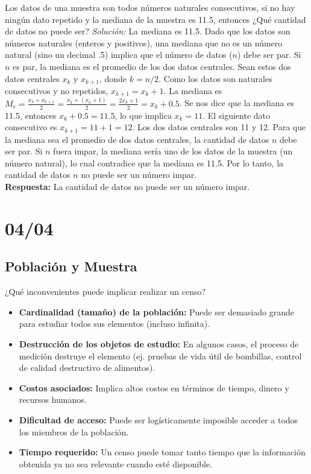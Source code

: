 \documentclass[12pt, letterpaper]{article}
\begin{document}
\vspace{1em}
\noindent Los datos de una muestra son todos números naturales consecutivos, si no hay ningún dato repetido y la mediana de la muestra es 11.5, entonces ¿Qué cantidad de datos no puede ser?
\textit{Solución:}
La mediana es 11.5. Dado que los datos son números naturales (enteros y positivos), una mediana que no es un número natural (sino un decimal .5) implica que el número de datos ($n$) debe ser par.
Si $n$ es par, la mediana es el promedio de los dos datos centrales. Sean estos dos datos centrales $x_k$ y $x_{k+1}$, donde $k=n/2$.
Como los datos son naturales consecutivos y no repetidos, $x_{k+1} = x_k + 1$.
La mediana es $M_e = \frac{x_k + x_{k+1}}{2} = \frac{x_k + (x_k+1)}{2} = \frac{2x_k+1}{2} = x_k + 0.5$.
Se nos dice que la mediana es 11.5, entonces $x_k + 0.5 = 11.5$, lo que implica $x_k = 11$.
El siguiente dato consecutivo es $x_{k+1} = 11+1 = 12$.
Los dos datos centrales son 11 y 12.
Para que la mediana sea el promedio de dos datos centrales, la cantidad de datos $n$ debe ser par.
Si $n$ fuera impar, la mediana sería uno de los datos de la muestra (un número natural), lo cual contradice que la mediana es 11.5.
Por lo tanto, la cantidad de datos $n$ no puede ser un número impar. \\
\textbf{Respuesta:} La cantidad de datos no puede ser un número impar.
\newpage

\section{04/04}
\subsection{Población y Muestra}
¿Qué inconvenientes puede implicar realizar un censo?
\begin{itemize}
    \item \textbf{Cardinalidad (tamaño) de la población:} Puede ser demasiado grande para estudiar todos sus elementos (incluso infinita).
    \item \textbf{Destrucción de los objetos de estudio:} En algunos casos, el proceso de medición destruye el elemento (ej. pruebas de vida útil de bombillas, control de calidad destructivo de alimentos).
    \item \textbf{Costos asociados:} Implica altos costos en términos de tiempo, dinero y recursos humanos.
    \item \textbf{Dificultad de acceso:} Puede ser logísticamente imposible acceder a todos los miembros de la población.
    \item \textbf{Tiempo requerido:} Un censo puede tomar tanto tiempo que la información obtenida ya no sea relevante cuando esté disponible.
\end{itemize}
\end{document}
